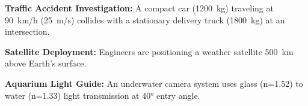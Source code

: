 \documentclass[addpoints]{exam}
\begin{document}
\begin{questions}
\begin{solution}[8cm]
    
\end{solution}

\question \textbf{Traffic Accident Investigation:} A compact car (\SI{1200}{kg}) traveling at \SI{90}{km/h} (\SI{25}{m/s}) collides with a stationary delivery truck (\SI{1800}{kg}) at an intersection.
\begin{solution}[8cm]
    
\end{solution}

\question \textbf{Satellite Deployment:} Engineers are positioning a weather satellite \SI{500}{km} above Earth's surface.
\begin{solution}[8cm]
    
\end{solution}


\question \textbf{Aquarium Light Guide:} An underwater camera system uses glass (n=1.52) to water (n=1.33) light transmission at \ang{40} entry angle.
\begin{parts}

\end{parts}
\end{questions}
\end{document}
